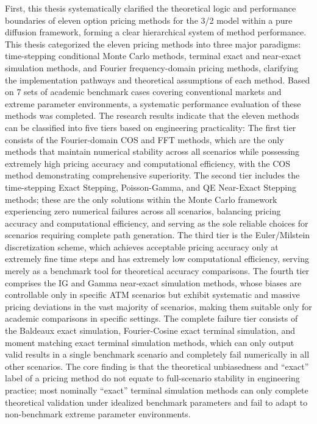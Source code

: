 First, this thesis systematically clarified the theoretical logic and performance boundaries of eleven option pricing methods for the 3/2 model within a pure diffusion framework, forming a clear hierarchical system of method performance. This thesis categorized the eleven pricing methods into three major paradigms: time-stepping conditional Monte Carlo methods, terminal exact and near-exact simulation methods, and Fourier frequency-domain pricing methods, clarifying the implementation pathways and theoretical assumptions of each method. Based on 7 sets of academic benchmark cases covering conventional markets and extreme parameter environments, a systematic performance evaluation of these methods was completed. The research results indicate that the eleven methods can be classified into five tiers based on engineering practicality: The first tier consists of the Fourier-domain COS and FFT methods, which are the only methods that maintain numerical stability across all scenarios while possessing extremely high pricing accuracy and computational efficiency, with the COS method demonstrating comprehensive superiority. The second tier includes the time-stepping Exact Stepping, Poisson-Gamma, and QE Near-Exact Stepping methods; these are the only solutions within the Monte Carlo framework experiencing zero numerical failures across all scenarios, balancing pricing accuracy and computational efficiency, and serving as the sole reliable choices for scenarios requiring complete path generation. The third tier is the Euler/Milstein discretization scheme, which achieves acceptable pricing accuracy only at extremely fine time steps and has extremely low computational efficiency, serving merely as a benchmark tool for theoretical accuracy comparisons. The fourth tier comprises the IG and Gamma near-exact simulation methods, whose biases are controllable only in specific ATM scenarios but exhibit systematic and massive pricing deviations in the vast majority of scenarios, making them suitable only for academic comparisons in specific settings. The complete failure tier consists of the Baldeaux exact simulation, Fourier-Cosine exact terminal simulation, and moment matching exact terminal simulation methods, which can only output valid results in a single benchmark scenario and completely fail numerically in all other scenarios. The core finding is that the theoretical unbiasedness and ``exact'' label of a pricing method do not equate to full-scenario stability in engineering practice; most nominally ``exact'' terminal simulation methods can only complete theoretical validation under idealized benchmark parameters and fail to adapt to non-benchmark extreme parameter environments.

